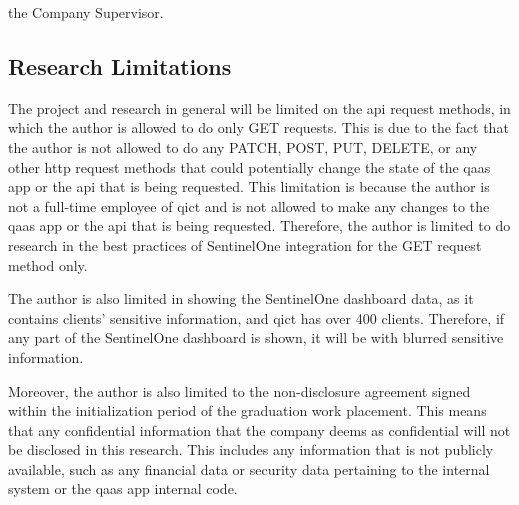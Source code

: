 \begin{multicols}{2}
\begin{itemize}[label=-]
                  the Company Supervisor.
      \end{itemize}
      \subsection{Research Limitations}
      The project and research in general will be limited on the \acrshort{api} request methods, in which the author
      is allowed to do only GET requests. This is due to the fact that the author is not allowed to do any PATCH,
      POST, PUT, DELETE, or any other \acrshort{http} request methods that could potentially change the state of the
      \acrshort{qaas} app or the \acrshort{api} that is being requested. This limitation is because the author is not a
      full-time employee of \acrshort{qict} and is not allowed to make any changes to the \acrshort{qaas} app or the
      \acrshort{api} that is being requested. Therefore, the author is limited to do research in the best practices
      of SentinelOne integration for the GET request method only.

      The author is also limited in showing the SentinelOne dashboard data, as it contains clients' sensitive
      information, and \acrshort{qict} has over 400 clients. Therefore, if any part of the SentinelOne dashboard is
      shown, it will be with blurred sensitive information.

      Moreover, the author is also limited to the non-disclosure agreement signed within the initialization period of
      the graduation work placement. This means that any confidential information that the company deems as confidential
      will not be disclosed in this research. This includes any information that is not publicly available, such as any
      financial data or security data pertaining to the internal system or the \acrshort{qaas} app internal code.


\end{multicols}
